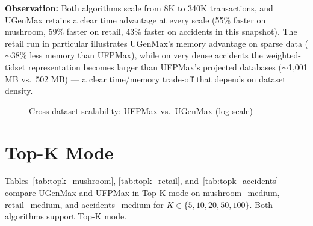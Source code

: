 \documentclass[12pt,a4paper]{report}
\begin{document}
  \textbf{Observation:} Both algorithms scale from 8K to 340K transactions, and UGenMax retains a clear time advantage at every scale (55\% faster on mushroom, 59\% faster on retail, 43\% faster on accidents in this snapshot). The retail run in particular illustrates UGenMax's memory advantage on sparse data ($\sim$38\% less memory than UFPMax), while on very dense accidents the weighted-tidset representation becomes larger than UFPMax's projected databases ($\sim$1,001 MB vs.\ 502 MB) --- a clear time/memory trade-off that depends on dataset density.

  \begin{figure}[h]
    \centering
    \caption{Cross-dataset scalability: UFPMax vs.\ UGenMax (log scale)}
    \label{fig:scalability}
  \end{figure}

  \section{Top-K Mode}

Tables~\ref{tab:topk_mushroom}, \ref{tab:topk_retail}, and~\ref{tab:topk_accidents} compare UGenMax and UFPMax in Top-K mode on mushroom\_medium, retail\_medium, and accidents\_medium for $K \in \{5,10,20,50,100\}$. Both algorithms support Top-K mode.
\end{document}
